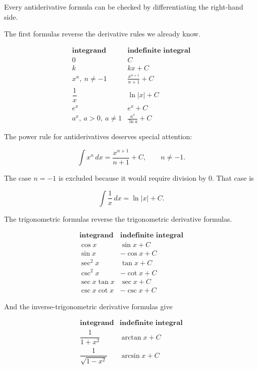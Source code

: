 Every antiderivative formula can be checked by differentiating the right-hand side.

The first formulas reverse the derivative rules we already know.

\[
\begin{array}{c|c}
\textbf{integrand} & \textbf{indefinite integral} \\ \hline
0 & \displaystyle C \\[6pt]
k & \displaystyle kx+C \\[6pt]
x^n,\ n\neq -1 & \displaystyle \frac{x^{n+1}}{n+1}+C \\[10pt]
\dfrac1x & \displaystyle \ln|x|+C \\[10pt]
e^x & \displaystyle e^x+C \\[6pt]
a^x,\ a>0,\ a\neq1 & \displaystyle \frac{a^x}{\ln a}+C
\end{array}
\]

The power rule for antiderivatives deserves special attention:

\[
\boxed{
\int x^n\,dx=\frac{x^{n+1}}{n+1}+C,
\qquad n\neq -1.
}
\]

The case \(n=-1\) is excluded because it would require division by \(0\).  That case is

\[
\int \frac1x\,dx=\ln|x|+C.
\]

The trigonometric formulas reverse the trigonometric derivative formulas.

\[
\begin{array}{c|c}
\textbf{integrand} & \textbf{indefinite integral} \\ \hline
\cos x & \displaystyle \sin x+C \\[6pt]
\sin x & \displaystyle -\cos x+C \\[6pt]
\sec^2 x & \displaystyle \tan x+C \\[6pt]
\csc^2 x & \displaystyle -\cot x+C \\[6pt]
\sec x\tan x & \displaystyle \sec x+C \\[6pt]
\csc x\cot x & \displaystyle -\csc x+C
\end{array}
\]

And the inverse-trigonometric derivative formulas give

\[
\begin{array}{c|c}
\textbf{integrand} & \textbf{indefinite integral} \\ \hline
\dfrac1{1+x^2} & \displaystyle \arctan x+C \\[12pt]
\dfrac1{\sqrt{1-x^2}} & \displaystyle \arcsin x+C
\end{array}
\]

